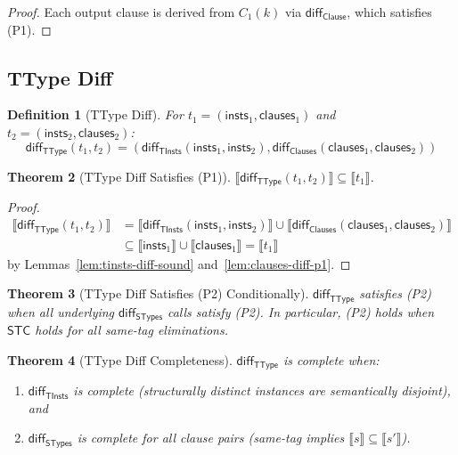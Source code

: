 \documentclass[11pt]{article}
\newtheorem{theorem}{Theorem}
\newtheorem{definition}[theorem]{Definition}
\newcommand{\sem}[1]{\llbracket #1 \rrbracket}
\newcommand{\diff}{\mathsf{diff}}
\newcommand{\TType}{\mathsf{TType}}
\newcommand{\Clauses}{\mathsf{Clauses}}
\newcommand{\Clause}{\mathsf{Clause}}
\newcommand{\STypes}{\mathsf{STypes}}
\newcommand{\TInsts}{\mathsf{TInsts}}
\newcommand{\insts}{\mathsf{insts}}
\newcommand{\clauses}{\mathsf{clauses}}
\begin{document}
\begin{proof}
Each output clause is derived from $C_1(k)$ via $\diff_{\Clause}$, which satisfies (P1).
\end{proof}

\subsection{TType Diff}

\begin{definition}[TType Diff]
\label{def:ttype-diff}
For $t_1 = (\insts_1, \clauses_1)$ and $t_2 = (\insts_2, \clauses_2)$:
\[
\diff_{\TType}(t_1, t_2) = (\diff_{\TInsts}(\insts_1, \insts_2), \diff_{\Clauses}(\clauses_1, \clauses_2))
\]
\end{definition}

\begin{theorem}[TType Diff Satisfies (P1)]
\label{thm:ttype-diff-p1}
$\sem{\diff_{\TType}(t_1, t_2)} \subseteq \sem{t_1}$.
\end{theorem}

\begin{proof}
\begin{align*}
\sem{\diff_{\TType}(t_1, t_2)} &= \sem{\diff_{\TInsts}(\insts_1, \insts_2)} \cup \sem{\diff_{\Clauses}(\clauses_1, \clauses_2)} \\
&\subseteq \sem{\insts_1} \cup \sem{\clauses_1} = \sem{t_1}
\end{align*}
by Lemmas~\ref{lem:tinsts-diff-sound} and~\ref{lem:clauses-diff-p1}.
\end{proof}

\begin{theorem}[TType Diff Satisfies (P2) Conditionally]
$\diff_{\TType}$ satisfies (P2) when all underlying $\diff_{\STypes}$ calls satisfy (P2).
In particular, (P2) holds when $\mathsf{STC}$ holds for all same-tag eliminations.
\end{theorem}

\begin{theorem}[TType Diff Completeness]
$\diff_{\TType}$ is complete when:
\begin{enumerate}
\item $\diff_{\TInsts}$ is complete (structurally distinct instances are semantically disjoint), and
\item $\diff_{\STypes}$ is complete for all clause pairs (same-tag implies $\sem{s} \subseteq \sem{s'}$).
\end{enumerate}
\end{theorem}
\end{document}
